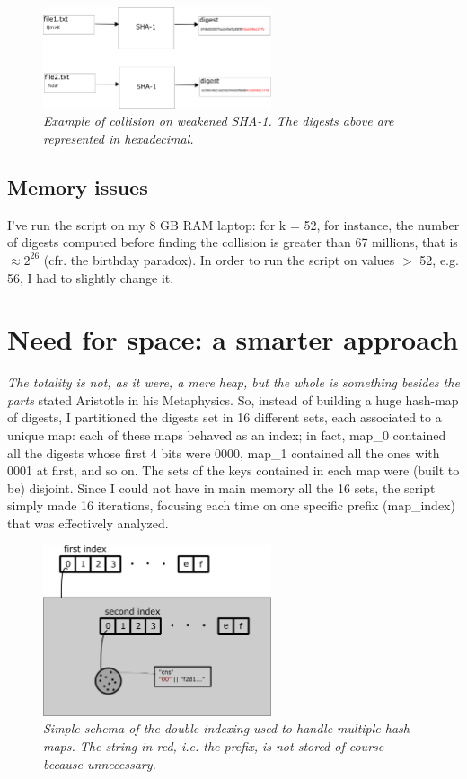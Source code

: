 \documentclass[11 pt]{article}
\begin{document}
\begin{figure}[!ht]
	\centering %
	\includegraphics[width=0.6\textwidth]{collision-hw2-1699981.png} %
	\caption{\textit{Example of collision on weakened SHA-1. The digests above are represented in hexadecimal.}} %
	\label{fig:collision}
\end{figure}

\subsection{Memory issues}
I've run the script on my 8 GB RAM laptop: for k = 52, for instance, the number of digests computed before finding the collision is greater than 67 millions, that is $\approx 2^{26}$ (cfr. the birthday paradox). In order to run the script on values $>$ 52, e.g. 56, I had to slightly change it.

\section{Need for space: a smarter approach}
\textit{The totality is not, as it were, a mere heap, but the whole is something besides the parts} stated Aristotle in his Metaphysics. So, instead of building a huge hash-map of digests, I partitioned the digests set in 16 different sets, each associated to a unique map: each of these maps behaved as an index; in fact, map\_0 contained all the digests whose first 4 bits were 0000, map\_1 contained all the ones with 0001 at first, and so on. The sets of the keys contained in each map were (built to be) disjoint. Since I could not have in main memory all the 16 sets, the script simply made 16 iterations, focusing each time on one specific prefix (map\_index) that was effectively analyzed.

\begin{figure}[!ht]
	\centering %
	\includegraphics[width=0.6\textwidth]{indexing-hw2-1699981.png} %
	\caption{\textit{Simple schema of the double indexing used to handle multiple hash-maps. The string in red, i.e. the prefix, is not stored of course because unnecessary.}} %
	\label{fig:indexing}
\end{figure}
\end{document}

